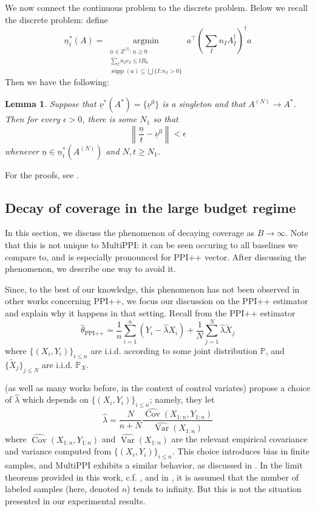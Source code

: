 \documentclass{article} %
\newcommand{\p}{\mathbb{P}}
\newcommand{\charlie}[1]{ {\color{red}[CCB: #1]}}
\newcommand{\adam}[1]{ {\color{magenta}[AF: #1]}}
\DeclareMathOperator{\Var}{Var}
\DeclareMathOperator{\Cov}{Cov}
\DeclareMathOperator{\supp}{supp}
\newtheorem{lemma}[lemma]{Lemma}
\newcommand{\ul}[1]{\underline{#1}}
\DeclareMathOperator{\argmin}{argmin}
\begin{document}

We now connect the continuous problem to the discrete problem. Below we recall the discrete problem: define
\begin{equation}\label{eqn:n}
        \underline{n}^*_t(A) = \underset{\substack{\ul{n}\in\mathbb{Z}^{|\mathcal{I}|} :\ul{n}\geq0 \\ \sum_I n_Ic_I\leq tB_0 \\ \supp(a)\subseteq \bigcup\{I:n_I>0\}}}{\argmin} a^\top \left(\sum_I n_I A_I^\dagger \right)^\dagger a
\end{equation}
Then we have the following:
\begin{lemma}\label{lemma:discrete-convergence}
    Suppose that $\ul{\nu}^*(A^*)=\{\ul{{\nu}}^0\}$ is a singleton and that $A^{(N)}\to A^*$. Then for every $\epsilon>0$, there is some $N_1$ so that
    \[
    \left\| \frac{\ul{n}}{t}-\ul{\nu}^0 \right\| <\epsilon
    \]
    whenever $\ul{n}\in\ul{n}^*_t(A^{(N)})$ and $N,t\geq N_1$. 
\end{lemma}

For the proofs, see .


\subsection{Decay of coverage in the large budget regime}\label{sec:coverage-decay}

In this section, we discuss the phenomenon of decaying coverage as $B\to\infty$. Note that this is not unique to MultiPPI: it can be seen occuring to all baselines we compare to, and is especially pronounced for PPI++ vector. After discussing the phenomenon, we describe one way to avoid it.

Since, to the best of our knowledge, this phenomenon has not been observed in other works concerning PPI++, we focus our discussion on the PPI++ estimator and explain why it happens in that setting. Recall from  the PPI++ estimator
\[
\hat{\theta}_{\text{PPI++}} = \frac{1}{n}\sum_{i=1}^n\left(Y_i-\widehat{\lambda}X_i\right) + \frac{1}{N}\sum_{j=1}^N \widehat{\lambda}\tilde{X}_j
\]
where $\{(X_i,Y_i)\}_{i\leq n}$ are i.i.d. according to some joint distribution $\p$, and $\{\tilde{X}_j\}_{j\leq N}$ are i.i.d. $\p_X$.

\citet{angelopoulos2023ppi++} (as well as many works before, in the context of control variates) propose a choice of $\widehat{\lambda}$ which depends on $\{(X_i,Y_i)\}_{i\leq n}$; namely, they let
\[
\widehat{\lambda} = \frac{N}{n+N}\frac{\widehat{\Cov}(X_{1:n},Y_{1:n})}{\widehat{\Var}(X_{1:n})}
\]
where $\widehat{\Cov}(X_{1:n},Y_{1:n})$ and $\widehat{\Var}(X_{1:n})$ are the relevant empirical covariance and variance computed from $\{(X_i,Y_i)\}_{i\leq n}$. This choice introduces bias in finite samples, and MultiPPI exhibits a similar behavior, as discussed in . In the limit theorems provided in this work, c.f. , and in \citet{angelopoulos2023ppi++}, it is assumed that the number of labeled samples (here, denoted $n$) tends to infinity. But this is not the situation presented in our experimental results.
\end{document}
